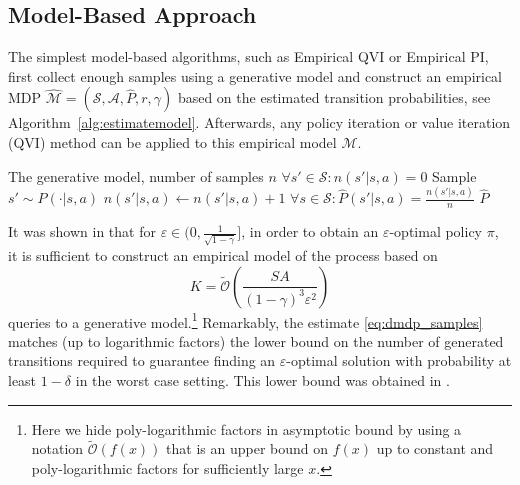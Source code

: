\documentclass{article}
\numberwithin{equation}{section}
\newcommand{\cA}{\mathcal{A}}
\newcommand{\cS}{\mathcal{S}}
\begin{document}
\subsection{Model-Based Approach}\label{subseq:model_based}
The simplest model-based algorithms, such as Empirical QVI or Empirical PI, first collect enough samples using a generative model and construct an empirical MDP 
\({\mathcal{\widehat{M}}} = (\mathcal{S}, \mathcal{A}, \widehat{P}, r, \gamma)\) based on the estimated transition probabilities, see Algorithm~\ref{alg:estimatemodel}. Afterwards, any policy iteration \cite{howard:dp} or value iteration (QVI) \cite{bellman1957markovian} method can be applied to this empirical model $\mathcal{M}$. 
\begin{algorithm}
\caption{Model Estimator}
\label{alg:estimatemodel}
\begin{algorithmic}[1]
\REQUIRE The generative model, number of samples $n$
\FOR{each $(s,a) \in \cS\times\cA$}
    \STATE $\forall s' \in \cS : n(s'|s,a) = 0$ 
        \STATE Sample $s' \sim P(\cdot | s,a)$ 
        \STATE $n(s'|s,a) \gets n(s'|s,a) + 1$ 
    \ENDFOR
    \STATE $\forall s \in \cS : \widehat{P}(s'|s,a) = \frac{n(s'|s,a)}{n}$ 
\ENDFOR
\RETURN $\widehat{P}$ 
\end{algorithmic}
\end{algorithm}
It was shown in \cite{agarwal2020model} that for $\varepsilon \in \bigl(0, \tfrac{1}{\sqrt{1-\gamma}}\bigr]$, in order to obtain an $\varepsilon$-optimal policy $\pi$, it is sufficient to construct an empirical model of the process based on
\begin{equation}\label{eq:dmdp_samples}
    K=\widetilde{\mathcal{O}}\left(\frac{S A}{(1-\gamma)^3\varepsilon^2}\right)
\end{equation}
queries to a generative model.\footnote{Here we hide poly-logarithmic factors in asymptotic bound by using a notation $\widetilde{\mathcal{O}}(f(x))$ that is an upper bound on $f(x)$ up to constant and poly-logarithmic factors for sufficiently large $x$.}
Remarkably, the estimate \eqref{eq:dmdp_samples} matches (up to logarithmic factors) the lower bound on the number of generated transitions required to guarantee finding an $\varepsilon$-optimal solution with probability at least $1-\delta$ in the worst case setting. This lower bound was obtained in \cite{gheshlaghi2013minimax}.
\end{document}
